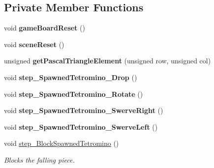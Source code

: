 \subsection*{Private Member Functions}
\begin{DoxyCompactItemize}
\item 
\mbox{\label{classTetreesEngine_ad28ed83be446f74c87d55d79cc64e6ef}} 
void {\bfseries game\+Board\+Reset} ()
\item 
\mbox{\label{classTetreesEngine_acb719449a68465839ebb0a5e7724cc34}} 
void {\bfseries scene\+Reset} ()
\item 
\mbox{\label{classTetreesEngine_a087f12761b955478bff1d4e70e6c0549}} 
unsigned {\bfseries get\+Pascal\+Triangle\+Element} (unsigned row, unsigned col)
\item 
\mbox{\label{classTetreesEngine_a626d60fa8adb2dd024016b5cfed4f6ee}} 
void {\bfseries step\+\_\+\+Spawned\+Tetromino\+\_\+\+Drop} ()
\item 
\mbox{\label{classTetreesEngine_a90d1d65e12fb37850962305d8bc3b7a3}} 
void {\bfseries step\+\_\+\+Spawned\+Tetromino\+\_\+\+Rotate} ()
\item 
\mbox{\label{classTetreesEngine_a46e1950877c8b8aa7e988ca3de14ad18}} 
void {\bfseries step\+\_\+\+Spawned\+Tetromino\+\_\+\+Swerve\+Right} ()
\item 
\mbox{\label{classTetreesEngine_ab7169a28a06a867ada69a01a580fb2ad}} 
void {\bfseries step\+\_\+\+Spawned\+Tetromino\+\_\+\+Swerve\+Left} ()
\item 
\mbox{\label{classTetreesEngine_a0978ef1f287f00a8ed5a4af2d680b943}} 
void \hyperlink{classTetreesEngine_a0978ef1f287f00a8ed5a4af2d680b943}{step\+\_\+\+Block\+Spawned\+Tetromino} ()
\begin{DoxyCompactList}\small\item\em Blocks the falling piece. \end{DoxyCompactList}\item 
\mbox{\label{classTetreesEngine_a25f8b896240ce2d2a34b1d968e75b5b6}} 

\end{DoxyCompactItemize}

